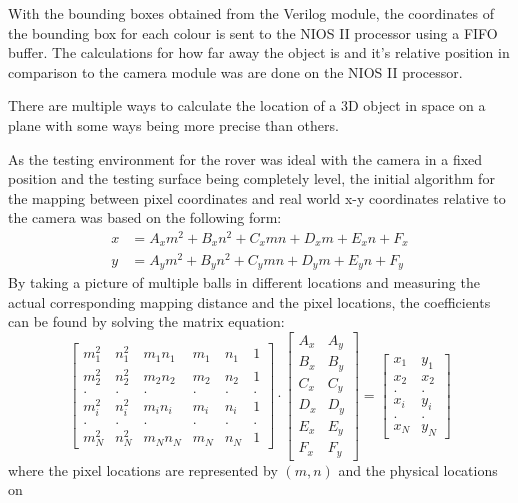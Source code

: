 \documentclass[a4paper]{article}
\begin{document}
With the bounding boxes obtained from the Verilog module, the coordinates of the
bounding box for each colour is sent to the NIOS II processor using a FIFO buffer.
The calculations for how far away the object is and it's relative position in 
comparison to the camera module was are done on the NIOS II processor. 

There are multiple ways to calculate the location of a 3D object in space on a plane
with some ways being more precise than others. 


As the testing environment for the rover was ideal with the camera in a fixed 
position and the testing surface being completely level, the initial algorithm 
for the mapping between pixel coordinates and real world x-y coordinates relative
to the camera was based on the following form: \begin{align*}
    x & = A_x m^2 + B_x n^2 + C_x mn + D_x m + E_x n + F_x \\
    y & = A_y m^2 + B_y n^2 + C_y mn + D_y m + E_y n + F_y  
\end{align*} By taking a picture of multiple balls in different locations and 
measuring the actual corresponding mapping distance and the pixel locations, the
coefficients can be found by solving the matrix equation: $$
    \begin{bmatrix}
        m^2_1 & n^2_1 & m_1n_1 & m_1 & n_1 & 1 \\
        m^2_2 & n^2_2 & m_2n_2 & m_2 & n_2 & 1 \\
        .     & .     &    .   &  .  & .   & . \\
        m^2_i & n^2_i & m_in_i & m_i & n_i & 1 \\  
        .     & .     &    .   &  .  & .   & . \\
        m^2_N & n^2_N & m_Nn_N & m_N & n_N & 1  
    \end{bmatrix}
    \cdot
    \begin{bmatrix}
        A_x & A_y \\
        B_x & B_y \\
        C_x & C_y \\
        D_x & D_y \\
        E_x & E_y \\
        F_x & F_y
    \end{bmatrix}
    =
    \begin{bmatrix}
        x_1 & y_1 \\
        x_2 & x_2 \\
        . & . \\
        x_i & y_i \\
        . & . \\
        x_N & y_N
    \end{bmatrix}
$$ where the pixel locations are represented by \((m,n)\) and the physical locations on
\end{document}
